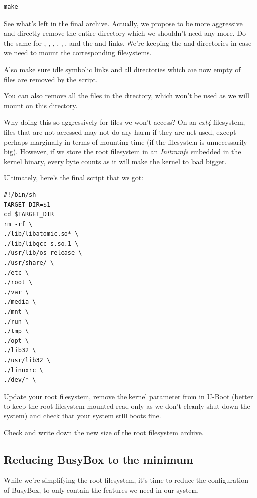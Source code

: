 \begin{verbatim}
make
\end{verbatim}

See what's left in the final archive. Actually, we propose to be more
aggressive and directly remove the entire  directory which we
shouldn't need any more. Do the same for , ,
, , , ,  and
the  and  links. We're keeping the 
and  directories in case we need to mount the corresponding
filesystems.

Also make sure idle symbolic links and all directories which are now
empty of files are removed by the script.

You can also remove all the files in the  directory,
which won't be used as we will mount  on this directory.

Why doing this so aggressively for files we won't access? On an {\em
ext4} filesystem, files that are not accessed may not do any harm if
they are not used, except perhaps marginally in terms of mounting time
(if the filesystem is unnecessarily big). However, if we store the root
filesystem in an {\em Initramfs} embedded in the kernel binary,
every byte counts as it will make the kernel to load bigger.

Ultimately, here's the final script that we got:
\begin{verbatim}
#!/bin/sh
TARGET_DIR=$1
cd $TARGET_DIR
rm -rf \
./lib/libatomic.so* \
./lib/libgcc_s.so.1 \
./usr/lib/os-release \
./usr/share/ \
./etc \
./root \
./var \
./media \
./mnt \
./run \
./tmp \
./opt \
./lib32 \
./usr/lib32 \
./linuxrc \
./dev/* \
\end{verbatim}

Update your root filesystem, remove the  kernel parameter from
\code{bootargs} in U-Boot (better to keep the root filesystem mounted read-only as we don't
cleanly shut down the system) and check that your system still boots fine.

Check and write down the new size of the root filesystem archive.

\subsection{Reducing BusyBox to the minimum}

While we're simplifying the root filesystem, it's time to reduce the
configuration of BusyBox, to only contain the features we need in our
system.

